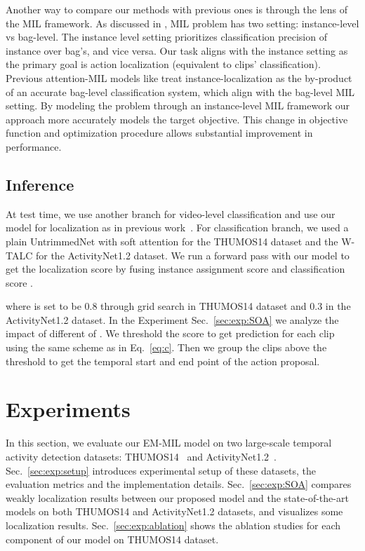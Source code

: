 \documentclass[runningheads]{llncs}
\begin{document}
\smallskip
Another way to compare our methods with previous ones is through the lens of the MIL framework. As discussed in \cite{survey-MIL}, MIL problem has two setting: instance-level vs bag-level. The instance level setting prioritizes classification precision of instance over bag's, and vice versa. Our task aligns with the instance setting as the primary goal is action localization (equivalent to clips' classification). Previous attention-MIL models like \cite{nguyen2018weakly,paul2018w,wang2017untrimmednets} treat instance-localization as the by-product of an accurate bag-level classification system, which align with the bag-level MIL setting. By modeling the problem through an instance-level MIL framework our approach more accurately models the target objective. This change in objective function and optimization procedure allows substantial improvement in performance.






\subsection{Inference}
At test time, we use another branch for video-level classification and use our model for localization as in previous work~\cite{shou2018autoloc}. For classification branch, we used a plain UntrimmedNet \cite{wang2017untrimmednets} with soft attention for the THUMOS14 dataset and the W-TALC \cite{paul2018w} for the ActivityNet1.2 dataset. We run a forward pass with our model to get the localization score  by fusing instance assignment score  and classification score .

where  is set to be 0.8 through grid search in THUMOS14 dataset and 0.3 in the ActivityNet1.2 dataset. 
In the Experiment Sec.~\ref{sec:exp:SOA} we analyze the impact of different of . We threshold the  score to get prediction  for each clip using the same scheme as in Eq.~\ref{eq:c}. Then we group the clips above the threshold to get the temporal start and end point of the action proposal. 



%
            
\section{Experiments}
\label{sec:exp}
In this section, we evaluate our EM-MIL model on two large-scale temporal activity detection datasets: THUMOS14~\cite{THUMOS14} and ActivityNet1.2~\cite{caba2015activitynet}. Sec.~\ref{sec:exp:setup} introduces experimental setup of these datasets, the evaluation metrics and the implementation details. Sec.~\ref{sec:exp:SOA} compares weakly localization results between our proposed model and the state-of-the-art models on both THUMOS14 and ActivityNet1.2 datasets, and visualizes some localization results. Sec.~\ref{sec:exp:ablation} shows the ablation studies for each component of our model on THUMOS14 dataset.
\end{document}
